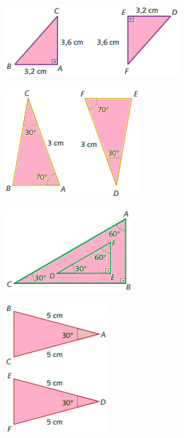 \begin{multicols}{2}
\begin{escolha}
\item \includegraphics[width=.5\textwidth]{./imgSAEB_8_MAT/media/image19.png}\\

\item \includegraphics[width=.3\textwidth]{./imgSAEB_8_MAT/media/image20.png}\\

\item \includegraphics[width=.4\textwidth]{./imgSAEB_8_MAT/media/image21.png}\\

\item \includegraphics[width=.3\textwidth]{./imgSAEB_8_MAT/media/image22.png}\\
\end{escolha}
\end{multicols}

